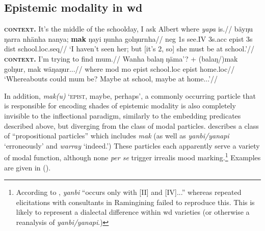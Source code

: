 \fi

	\iffalse
		The entries i had in the FoDS talk (definitely don't get it right):
		
		
		\gls{II} as modal-for-the-present
		
		
		$$\llbracket \gls{II}(\varphi)\rrbracket^{w,t*,\textbf{\textsc{mb}}}\leftrightarrow\forall w^\prime\in \textsc{\textbf{mb}}(w,t*)[t*\preceq t^\prime\wedge\varphi(w^\prime,t^\prime)] $$
		\textit{$ \varphi $ holds at or after speech time in all worlds that are \textbf{mb-}accessible from $ w $}
		
		\gls{IV} as modal-for-the-past
		
		
		$$\llbracket\gls{IV}(\varphi)\rrbracket^{w,t*,\textbf{\textsc{mb}}}\leftrightarrow\forall w^\prime\in \textsc{\textbf{mb}}(w,t*)[t*\succ t^\prime\wedge\varphi(w^\prime,t^\prime)] $$
		\textit{$ \varphi $ holds before speech time in all worlds that are \textbf{mb-}accessible from $ w $}
	\fi
	
	
	
	
	\subsection{Epistemic modality in \gls{wd}}
	\pex\a\begingl\glpreamble\textbf{\textsc{context}.} It's the middle of the schoolday, I ask Albert where \textit{yapa} is.//
	\gla bäyŋu ŋarra nhänha nanya; \textbf{mak} ŋayi ŋunha golŋurnha//
	\glb \gls{neg} 1s see.\gls{IV} 3s.\gls{acc} \gls{epist} 3s \gls{dist} school.\gls{loc}.\gls{seq}//
	\glft`I haven't seen her; but [it's 2, so] she must be at school.'\trailingcitation{[AW~20190429]}//\endgl
	\a\begingl\glpreamble\textbf{\textsc{context.}} I'm trying to find mum.//
	\gla Wanha balaŋ ŋäma'? + (balaŋ/)mak golŋur, mak wäŋaŋur...//
	\glb where \gls{mod} \gls{mo} \gls{epist} school.\gls{loc} \gls{epist} home.\gls{loc}//
	\glft`Whereabouts could mum be? Maybe at school, maybe at home...'//\endgl
	\xe
	
	
	
	In addition, \textit{mak(u)} `\textsc{epist, }maybe, perhaps', a commonly occurring particle that is responsible for encoding shades of epistemic modality is also completely invisible to the inflectional paradigm, similarly to the embedding predicates described above, but diverging from the class of modal particles. \citet[685]{Wilkinson1991} describes a class of ``propositional particles'' which includes \textit{mak} (as well as \textit{yanbi\slash{}yanapi} `erroneously' and \textit{warray} `indeed.') These particles each apparently serve a variety of modal function, although none \textit{per se} trigger irrealis mood marking.\footnote{According to \citet[686]{Wilkinson1991}, \textit{yanbi} ``occurs only with [\gls{II}] and [\gls{IV}]...'' whereas repeated elicitations with consultants in Ramingining failed to reproduce this. This is likely to represent a dialectal difference within \gls{wd} varieties (or otherwise a reanalysis of \textit{yanbi\slash{}yanapi}.)} Examples are given in ().
	
